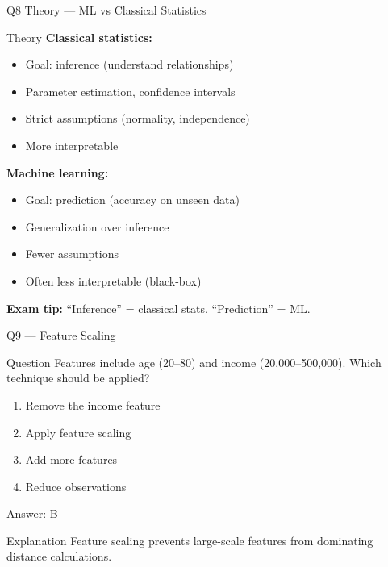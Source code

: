 \documentclass[aspectratio=169,8pt]{beamer}
\begin{document}
	\begin{frame}{Q8 Theory --- ML vs Classical Statistics}
		\begin{block}{Theory}
			\textbf{Classical statistics:}
			\begin{itemize}
				\item Goal: inference (understand relationships)
				\item Parameter estimation, confidence intervals
				\item Strict assumptions (normality, independence)
				\item More interpretable
			\end{itemize}
			\textbf{Machine learning:}
			\begin{itemize}
				\item Goal: prediction (accuracy on unseen data)
				\item Generalization over inference
				\item Fewer assumptions
				\item Often less interpretable (black-box)
			\end{itemize}
			\textbf{Exam tip:} ``Inference'' = classical stats. ``Prediction'' = ML.
		\end{block}
	\end{frame}
	
	\begin{frame}{Q9 --- Feature Scaling}
		\begin{block}{Question}
			Features include age (20--80) and income (20,000--500,000). Which technique should be applied?
		\end{block}
		\begin{enumerate}[label=\Alph*.]
			\item Remove the income feature
			\item Apply feature scaling
			\item Add more features
			\item Reduce observations
		\end{enumerate}
		\begin{exampleblock}{Answer: B}
		\end{exampleblock}
		\begin{block}{Explanation}
			Feature scaling prevents large-scale features from dominating distance calculations.
		\end{block}
	\end{frame}
	
\end{document}
